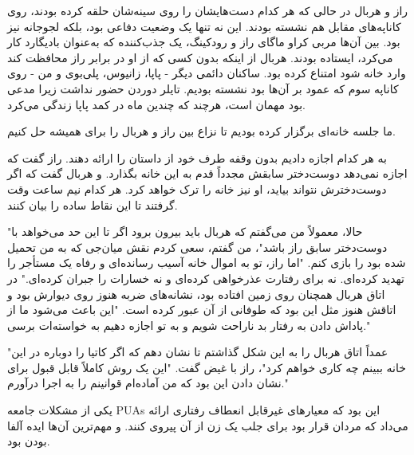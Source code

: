 راز و هربال در حالی که هر کدام دست‌هایشان را روی سینه‌شان حلقه کرده بودند، روی کاناپه‌های مقابل هم نشسته بودند. این نه تنها یک وضعیت دفاعی بود، بلکه لجوجانه نیز بود. بین آن‌ها مربی کراو ماگای راز و رودکینگ، یک جذب‌کننده که به‌عنوان بادیگارد کار می‌کرد، ایستاده بودند. هربال از اینکه بدون کسی که از او در برابر راز محافظت کند وارد خانه شود امتناع کرده بود. ساکنان دائمی دیگر - پاپا، زانیوس، پلی‌بوی و من - روی کاناپه سوم که عمود بر آن‌ها بود نشسته بودیم. تایلر دوردن حضور نداشت زیرا مدعی بود مهمان است، هرچند که چندین ماه در کمد پاپا زندگی می‌کرد.

ما جلسه خانه‌ای برگزار کرده بودیم تا نزاع بین راز و هربال را برای همیشه حل کنیم.

به هر کدام اجازه دادیم بدون وقفه طرف خود از داستان را ارائه دهند. راز گفت که اجازه نمی‌دهد دوست‌دختر سابقش مجدداً قدم به این خانه بگذارد. و هربال گفت که اگر دوست‌دخترش نتواند بیاید، او نیز خانه را ترک خواهد کرد. هر کدام نیم ساعت وقت گرفتند تا این نقاط ساده را بیان کنند.

"حالا، معمولاً من می‌گفتم که هربال باید بیرون برود اگر تا این حد می‌خواهد با دوست‌دختر سابق راز باشد"، من گفتم، سعی کردم نقش میان‌جی که به من تحمیل شده بود را بازی کنم. "اما راز، تو به اموال خانه آسیب رسانده‌ای و رفاه یک مستأجر را تهدید کرده‌ای. نه برای رفتارت عذرخواهی کرده‌ای و نه خسارات را جبران کرده‌ای." در اتاق هربال همچنان روی زمین افتاده بود، نشانه‌های ضربه هنوز روی دیوارش بود و اتاقش هنوز مثل این بود که طوفانی از آن عبور کرده است. "این باعث می‌شود ما از پاداش دادن به رفتار بد ناراحت شویم و به تو اجازه دهیم به خواسته‌ات برسی."

"عمداً اتاق هربال را به این شکل گذاشتم تا نشان دهم که اگر کاتیا را دوباره در این خانه ببینم چه کاری خواهم کرد"، راز با غیض گفت. "این یک روش کاملاً قابل قبول برای نشان دادن این بود که من آماده‌ام قوانینم را به اجرا درآورم."

یکی از مشکلات جامعه PUAs این بود که معیارهای غیرقابل انعطاف رفتاری ارائه می‌داد که مردان قرار بود برای جلب یک زن از آن پیروی کنند. و مهم‌ترین آن‌ها ایده آلفا بودن بود.